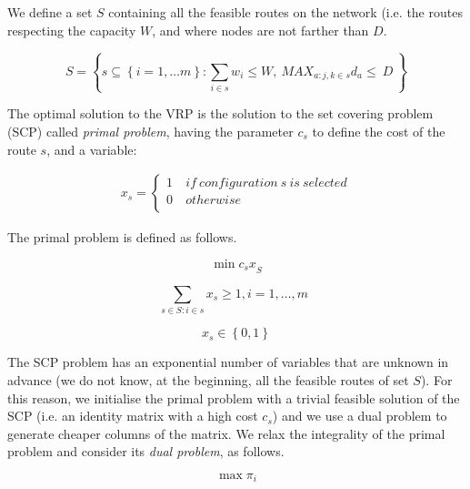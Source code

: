We define a set $S$ containing all the feasible routes on the network (i.e. the routes respecting the capacity $W$, and where nodes are not farther than $D$.

\begin{equation}
    S=\left\{s\subseteq\left\{i=1,\ldots m\right\}:\sum_{i\in s}{w_i\le W},\ {MAX_{a:j,k\in s}{d}_a\le\ D}\ \right\}
\end{equation}

The optimal solution to the VRP is the solution to the set covering problem (SCP) called \textit{primal problem}, having the parameter $c_s$ to define the cost of the route $s$, and a variable:

\begin{equation}
   \begin{split}
   x_s=\left\{
                \begin{array}{ll}
                  1\ & if\ configuration\ s\ is\ selected\\
                  0 & otherwise\\
                \end{array}
              \right.
   \end{split}
\end{equation}

The primal problem is defined as follows.

\begin{equation}
   \min{c_sx}_S
\end{equation}

\begin{equation}
   \sum_{s\in S:i\in s}{x_s\geq1}, i=1,\ldots,m\ \ 
\end{equation}

\begin{equation}
    x_s\in\left\{0,1\right\}
\end{equation}

The SCP problem has an exponential number of variables that are unknown in advance (we do not know, at the beginning, all the feasible routes of set $S$). For this reason, we initialise the primal problem with a trivial feasible solution of the SCP (i.e. an identity matrix with a high cost $c_s$) and we use a dual problem to generate cheaper columns of the matrix. We relax the integrality of the primal problem and consider its \textit{dual problem}, as follows.

\begin{equation}
    \max{\pi_i}
\end{equation}

